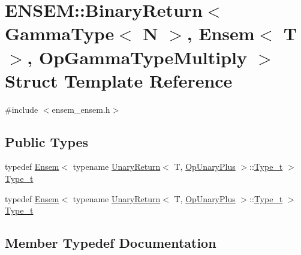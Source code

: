 \hypertarget{structENSEM_1_1BinaryReturn_3_01GammaType_3_01N_01_4_00_01Ensem_3_01T_01_4_00_01OpGammaTypeMultiply_01_4}{}\section{E\+N\+S\+EM\+:\+:Binary\+Return$<$ Gamma\+Type$<$ N $>$, Ensem$<$ T $>$, Op\+Gamma\+Type\+Multiply $>$ Struct Template Reference}
\label{structENSEM_1_1BinaryReturn_3_01GammaType_3_01N_01_4_00_01Ensem_3_01T_01_4_00_01OpGammaTypeMultiply_01_4}


{\ttfamily \#include $<$ensem\+\_\+ensem.\+h$>$}

\subsection*{Public Types}
\begin{DoxyCompactItemize}
\item 
typedef \mbox{\hyperlink{classENSEM_1_1Ensem}{Ensem}}$<$ typename \mbox{\hyperlink{structENSEM_1_1UnaryReturn}{Unary\+Return}}$<$ T, \mbox{\hyperlink{structENSEM_1_1OpUnaryPlus}{Op\+Unary\+Plus}} $>$\+::\mbox{\hyperlink{structENSEM_1_1BinaryReturn_3_01GammaType_3_01N_01_4_00_01Ensem_3_01T_01_4_00_01OpGammaTypeMultiply_01_4_adac71026bdd760ed5ab7f1bc1bab2d5a}{Type\+\_\+t}} $>$ \mbox{\hyperlink{structENSEM_1_1BinaryReturn_3_01GammaType_3_01N_01_4_00_01Ensem_3_01T_01_4_00_01OpGammaTypeMultiply_01_4_adac71026bdd760ed5ab7f1bc1bab2d5a}{Type\+\_\+t}}
\item 
typedef \mbox{\hyperlink{classENSEM_1_1Ensem}{Ensem}}$<$ typename \mbox{\hyperlink{structENSEM_1_1UnaryReturn}{Unary\+Return}}$<$ T, \mbox{\hyperlink{structENSEM_1_1OpUnaryPlus}{Op\+Unary\+Plus}} $>$\+::\mbox{\hyperlink{structENSEM_1_1BinaryReturn_3_01GammaType_3_01N_01_4_00_01Ensem_3_01T_01_4_00_01OpGammaTypeMultiply_01_4_adac71026bdd760ed5ab7f1bc1bab2d5a}{Type\+\_\+t}} $>$ \mbox{\hyperlink{structENSEM_1_1BinaryReturn_3_01GammaType_3_01N_01_4_00_01Ensem_3_01T_01_4_00_01OpGammaTypeMultiply_01_4_adac71026bdd760ed5ab7f1bc1bab2d5a}{Type\+\_\+t}}
\end{DoxyCompactItemize}


\subsection{Member Typedef Documentation}
\mbox{\label{structENSEM_1_1BinaryReturn_3_01GammaType_3_01N_01_4_00_01Ensem_3_01T_01_4_00_01OpGammaTypeMultiply_01_4_adac71026bdd760ed5ab7f1bc1bab2d5a}} 
